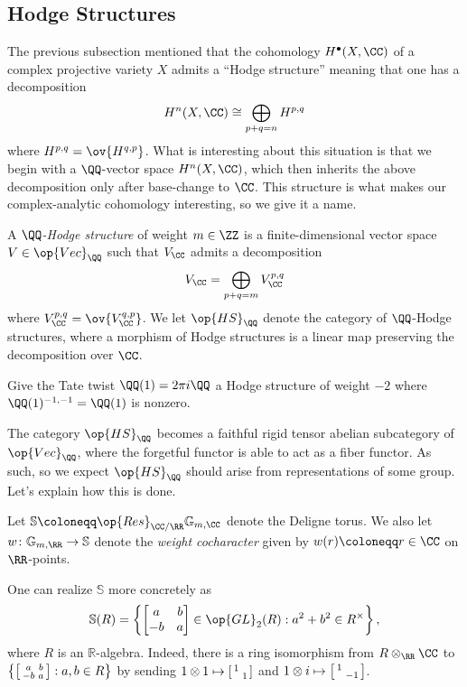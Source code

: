 \documentclass{article}
\begin{document}
\subsection{Hodge Structures}
The previous subsection mentioned that the cohomology $H^\bullet(X,\CC)$ of a complex projective variety $X$ admits a ``Hodge structure'' meaning that one has a decomposition
\[H^n(X,\CC)\cong\bigoplus_{p+q=n}H^{p,q}\]
where $H^{p,q}=\ov{H^{q,p}}$. What is interesting about this situation is that we begin with a $\QQ$-vector space $H^n(X,\CC)$, which then inherits the above decomposition only after base-change to $\CC$. This structure is what makes our complex-analytic cohomology interesting, so we give it a name.
\begin{definition}
	A \textit{$\QQ$-Hodge structure} of weight $m\in\ZZ$ is a finite-dimensional vector space $V\in\op{Vec}_\QQ$ such that $V_\CC$ admits a decomposition
	\[V_\CC=\bigoplus_{p+q=m}V^{p,q}_\CC\]
	where $V^{p,q}_\CC=\ov{V^{q,p}_\CC}$. We let $\op{HS}_\QQ$ denote the category of $\QQ$-Hodge structures, where a morphism of Hodge structures is a linear map preserving the decomposition over $\CC$.
\end{definition}
\begin{example}
	Give the Tate twist $\QQ(1)=2\pi i\QQ$ a Hodge structure of weight $-2$ where $\QQ(1)^{-1,-1}=\QQ(1)$ is nonzero.
\end{example}
The category $\op{HS}_\QQ$ becomes a faithful rigid tensor abelian subcategory of $\op{Vec}_\QQ$, where the forgetful functor is able to act as a fiber functor. As such, so we expect $\op{HS}_\QQ$ should arise from representations of some group. Let's explain how this is done.
\begin{notation}
	Let $\mathbb S\coloneqq\op{Res}_{\CC/\RR}\mathbb G_{m,\CC}$ denote the Deligne torus. We also let $w\colon\mathbb G_{m,\RR}\to\mathbb S$ denote the \textit{weight cocharacter} given by $w(r)\coloneqq r\in\CC$ on $\RR$-points.
\end{notation}
\begin{remark} \label{rem:concrete-deligne-torus}
	One can realize $\mathbb S$ more concretely as
	\[\mathbb S(R)=\left\{\begin{bmatrix}
		a & b \\ -b & a
	\end{bmatrix}\in{\op{GL}_2(R)}:a^2+b^2\in R^\times\right\},\]
	where $R$ is an $\mathbb R$-algebra. Indeed, there is a ring isomorphism from $R\otimes_\RR\CC$ to $\left\{\begin{bsmallmatrix}
		a & b \\ -b & a
	\end{bsmallmatrix}:a,b\in R\right\}$ by sending $1\otimes1\mapsto\begin{bsmallmatrix}
		1 \\ & 1
	\end{bsmallmatrix}$ and $1\otimes i\mapsto\begin{bsmallmatrix}
		1 \\ & -1
	\end{bsmallmatrix}$.
\end{remark}
\end{document}
